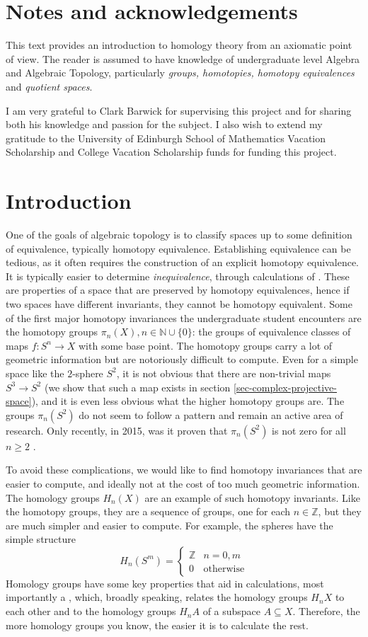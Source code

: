 \section{Notes and acknowledgements}
This text provides an introduction to homology theory from an axiomatic point of view. The reader is assumed to have knowledge of undergraduate level Algebra and Algebraic Topology, particularly \textit{groups, homotopies, homotopy equivalences} and \textit{quotient spaces}.

I am very grateful to Clark Barwick for supervising this project and for sharing both his knowledge and passion for the subject. I also wish to extend my gratitude to the University of Edinburgh School of Mathematics Vacation Scholarship and College Vacation Scholarship funds for funding this project.
\section{Introduction}
One of the goals of algebraic topology is to classify spaces up to some definition of equivalence, typically homotopy equivalence. Establishing equivalence can be tedious, as it often requires the construction of an explicit homotopy equivalence. It is typically easier to determine \textit{inequivalence}, through calculations of . These are properties of a space that are preserved by homotopy equivalences, hence if two spaces have different invariants, they cannot be homotopy equivalent. Some of the first major homotopy invariances the undergraduate student encounters are the homotopy groups $\pi_n(X),n\in \mathbb{N}\cup \{0\}$: the groups of equivalence classes of maps $f:S^{n}\rightarrow X$ with some base point. The homotopy groups carry a lot of geometric information but are notoriously difficult to compute. Even for a simple space like the $2$-sphere $S^2$, it is not obvious that there are non-trivial maps $S^3\rightarrow S^2$ (we show that such a map exists in section \ref{sec-complex-projective-space}), and it is even less obvious what the higher homotopy groups are. The groups $\pi_n(S^2)$ do not seem to follow a pattern and remain an active area of research. Only recently, in 2015, was it proven that $\pi_n(S^2)$ is not zero for all $n\geq 2$ \cite{Ivanov}.

To avoid these complications, we would like to find homotopy invariances that are easier to compute, and ideally not at the cost of too much geometric information. The homology groups $H_n(X)$ are an example of such homotopy invariants. Like the homotopy groups, they are a sequence of groups, one for each $n\in \mathbb{Z}$, but they are much simpler and easier to compute. For example, the spheres have the simple structure $$H_n(S^m)=\begin{cases}\mathbb{Z} & n=0,m\\ 0 & \text{otherwise}\end{cases}$$ 
Homology groups have some key properties that aid in calculations, most importantly a , which, broadly speaking, relates the homology groups $H_nX$ to each other and to the homology groups $H_nA$ of a subspace $A\subseteq X$. Therefore, the more homology groups you know, the easier it is to calculate the rest.

